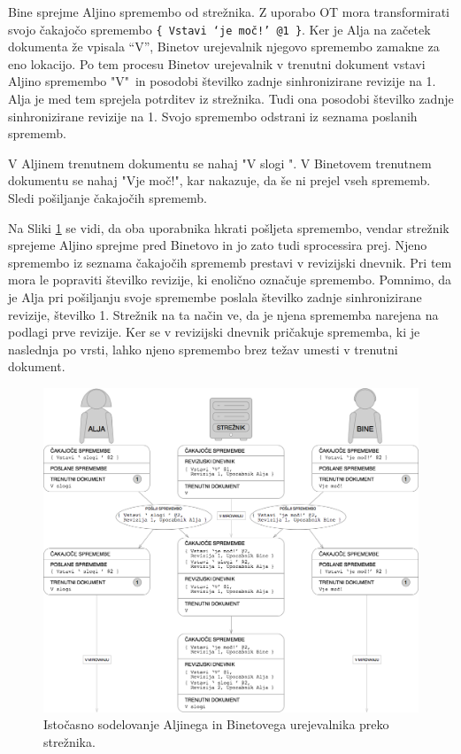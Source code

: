 \documentclass[a4paper, 12pt, twoside]{book}
\begin{document}
Bine sprejme Aljino spremembo od strežnika. Z uporabo OT mora transformirati svojo čakajočo spremembo {\tt \{ Vstavi ‘je moč!’ @1 \}}. Ker je Alja na začetek dokumenta že vpisala “V”, Binetov urejevalnik njegovo spremembo zamakne za eno lokacijo. Po tem procesu Binetov urejevalnik v trenutni dokument vstavi Aljino spremembo "V"\ in posodobi številko zadnje sinhronizirane revizije na 1. Alja je med tem sprejela potrditev iz strežnika. Tudi ona posodobi številko zadnje sinhronizirane revizije na 1. Svojo spremembo odstrani iz seznama poslanih sprememb.

V Aljinem trenutnem dokumentu se nahaj "V slogi ". V Binetovem trenutnem dokumentu se nahaj "Vje moč!", kar nakazuje, da še ni prejel vseh sprememb. Sledi pošiljanje čakajočih sprememb.

\pagebreak

Na Sliki \ref{pc4} se vidi, da oba uporabnika hkrati pošljeta spremembo, vendar strežnik sprejeme Aljino sprejme pred Binetovo in jo zato tudi sprocessira prej. Njeno spremembo iz seznama čakajočih sprememb prestavi v revizijski dnevnik. Pri tem mora le popraviti številko revizije, ki enolično označuje spremembo. Pomnimo, da je Alja pri pošiljanju svoje spremembe poslala številko zadnje sinhronizirane revizije, številko 1. Strežnik na ta način ve, da je njena sprememba narejena na podlagi prve revizije. Ker se v revizijski dnevnik pričakuje sprememba, ki je naslednja po vrsti, lahko njeno spremembo brez težav umesti v trenutni dokument.

\begin{figure}[placement h]
\begin{center}
\includegraphics[width=14cm]{pc4.png}
\end{center}
\caption{Istočasno sodelovanje Aljinega in Binetovega urejevalnika preko strežnika.}
\label{pc4}
\end{figure}
\end{document}
